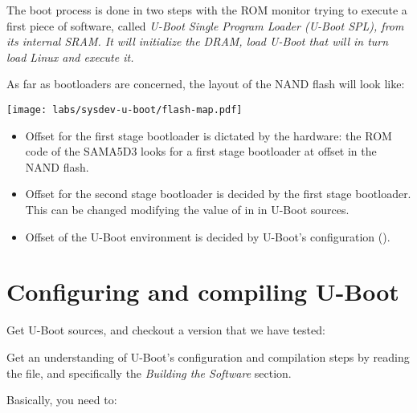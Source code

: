The boot process is done in two steps with the ROM monitor trying to
execute a first piece of software, called \em{U-Boot Single Program
Loader (U-Boot SPL)}, from its internal SRAM. It will initialize the
DRAM, load \em{U-Boot} that will in turn load Linux and execute it.

As far as bootloaders are concerned, the layout of the NAND flash will
look like:

\begin{center}
  \texttt{[image: labs/sysdev-u-boot/flash-map.pdf]}
\end{center}

\begin{itemize}
\item Offset  for the first stage bootloader is dictated by
  the hardware: the ROM code of the SAMA5D3 looks for a first stage
  bootloader at offset  in the NAND flash.
\item Offset  for the second stage bootloader is decided
  by the first stage bootloader. This can be changed modifying the
  value of  in
   in U-Boot
  sources.
\item Offset  of the U-Boot environment is decided by
  U-Boot's configuration ().
\end{itemize}

\section{Configuring and compiling U-Boot}

Get U-Boot sources, and checkout a version that we have tested:


Get an understanding of U-Boot's
configuration and compilation steps by reading the  file,
and specifically the {\em Building the Software} section.

Basically, you need to:


